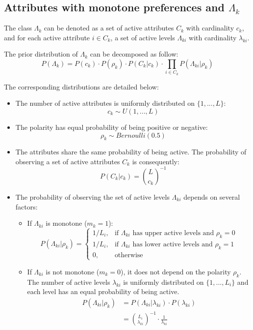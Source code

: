 \documentclass[12pt]{article}
\begin{document}
\subsection{Attributes with monotone preferences and $\Lambda_k$} \label{sec:lambda}

The class $\Lambda_k$ can be denoted as a set of active attributes $C_k$ with cardinality $c_k$, and for each active attribute $i\in C_k$, a set of active levels $\Lambda_{ki}$ with cardinality $\lambda_{ki}$.

The prior distribution of $\Lambda_k$ can be decomposed as follow:
\begin{equation}
	P(\Lambda_{k}) = P(c_k) \cdot P(\rho_k) \cdot P(C_k|c_k) \cdot \prod_{i\in C_k} P(\Lambda_{ki}|\rho_k)
\end{equation}

The corresponding distributions are detailed below:
\begin{itemize}
	\item The number of active attributes is uniformly distributed on $\{1,...,L\}$:
	$$c_k \sim U(1,...,L)$$
	\item The polarity has equal probability of being positive or negative:
	$$\rho_k \sim Bernoulli(0.5)$$
	\item The attributes share the same probability of being active. The probability of observing a set of active attributes $C_k$ is consequently:
	$$ P(C_k|c_k) = \binom{L}{c_k}^{-1}$$ 
	\item The probability of observing the set of active levels $\Lambda_{ki}$ depends on several factors:
	\begin{itemize}
		\item If $\Lambda_{ki}$ is monotone ($m_k=1$):
		$$P(\Lambda_{ki}|\rho_k) =  
			\begin{cases}
				1/L_i,& \text{if } \Lambda_{ki} \text{ has upper active levels and } \rho_k = 0\\
				1/L_i,& \text{if } \Lambda_{ki} \text{ has lower active levels and } \rho_k = 1\\
				0,              & \text{otherwise}
			\end{cases}
		$$
		\item If $\Lambda_{ki}$ is not monotone ($m_k=0$), it does not depend on the polarity $\rho_k$. The number of active levels $\lambda_{ki}$ is uniformly distributed on $\{1,...,L_i\}$ and each level has an equal probability of being active.
		\begin{align*}
			P(\Lambda_{ki}|\rho_k) & = P(\Lambda_{ki}|\lambda_{ki})\cdot P(\lambda_{ki}) \\
				& = \binom{L_i}{\lambda_{ki}}^{-1} \cdot \frac{1}{\lambda_{ki}}
		\end{align*}
	\end{itemize}
\end{itemize}
\end{document}
